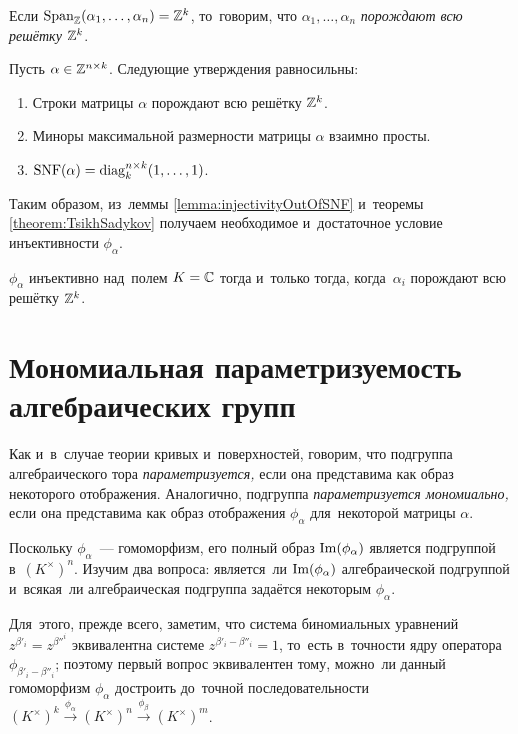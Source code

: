 \documentclass[a4paper,oneside]{article}
\begin{document}
Если $\mathrm{Span}_{\mathbb{Z}}(\alpha_1, \ldots, \alpha_n) = \mathbb{Z}^k$, то~говорим, что $\alpha_1, \ldots, \alpha_n$ \textit{порождают всю решётку} $\mathbb{Z}^k$.

\begin{theorem}
\label{theorem:TsikhSadykov}
    Пусть $\alpha \in \mathbb{Z}^{n \times k}$. Следующие утверждения равносильны:
    \begin{enumerate}
        \item Строки матрицы $\alpha$ порождают всю решётку $\mathbb{Z}^k$.
        \item Миноры максимальной размерности матрицы $\alpha$ взаимно просты.
        \item $\mathrm{SNF}(\alpha) = \mathrm{diag}^{n \times k}_k(1, \ldots, 1)$.
    \end{enumerate}
\end{theorem}

Таким образом, из~леммы \ref{lemma:injectivityOutOfSNF} и~теоремы \ref{theorem:TsikhSadykov}
получаем необходимое и~достаточное условие инъективности $\phi_\alpha$.

\begin{theorem*}
    $\phi_\alpha$ инъективно над~полем $K = \mathbb{C}$ тогда и~только тогда, когда~$\alpha_i$ порождают всю решётку $\mathbb{Z}^k$.
\end{theorem*}

\section{Мономиальная параметризуемость алгебраических групп}

Как и~в~случае теории кривых и~поверхностей, говорим, что подгруппа алгебраического тора \textit{параметризуется,}
если она представима как образ некоторого отображения. Аналогично, подгруппа \textit{параметризуется мономиально,}
если она представима как образ отображения $\phi_\alpha$ для~некоторой матрицы $\alpha$.

Поскольку $\phi_\alpha$~— гомоморфизм, его полный образ $\mathrm{Im}(\phi_\alpha)$ является подгруппой в~$(K^\times)^n$.
Изучим два вопроса: является~ли $\mathrm{Im}(\phi_\alpha)$ алгебраической подгруппой и~всякая~ли алгебраическая подгруппа задаётся некоторым $\phi_\alpha$.

Для~этого, прежде всего, заметим, что система биномиальных уравнений $z^{\beta'_i} = z^{\beta''^i}$ эквивалентна
системе $z^{\beta'_i - \beta''_i} = 1$, то~есть в~точности ядру оператора $\phi_{\beta'_i - \beta''_i}$;
поэтому первый вопрос эквивалентен тому, можно~ли данный гомоморфизм $\phi_\alpha$ достроить
до~точной последовательности $(K^\times)^k \xrightarrow[]{\phi_\alpha} (K^\times)^n \xrightarrow[]{\phi_\beta} (K^\times)^m$.
\end{document}
